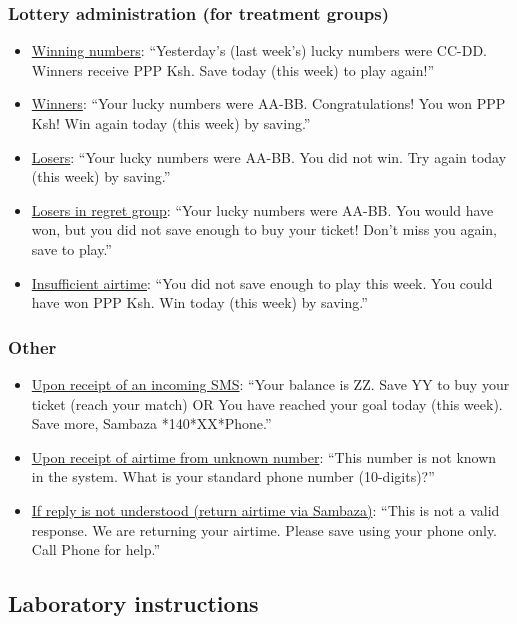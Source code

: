 \documentclass[11pt]{article}
\begin{document}
        \subsubsection{Lottery administration (for treatment groups)}

            \begin{itemize}
                \item \underline{Winning numbers}: ``Yesterday's (last week's) lucky numbers were CC-DD. Winners receive PPP Ksh. Save today (this week) to play again!''
                \item \underline{Winners}: ``Your lucky numbers were AA-BB. Congratulations!  You won PPP Ksh!  Win again today (this week) by saving.''
                \item \underline{Losers}: ``Your lucky numbers were AA-BB. You did not win. Try again today (this week) by saving.''
                \item \underline{Losers in regret group}: ``Your lucky numbers were AA-BB. You would have won, but you did not save enough to buy your ticket!  Don't miss you again, save to play.''
                \item \underline{Insufficient airtime}: ``You did not save enough to play this week. You could have won PPP Ksh. Win today (this week) by saving.''
            \end{itemize}

        \subsubsection{Other}

            \begin{itemize}
                \item \underline{Upon receipt of an incoming SMS}: ``Your balance is ZZ. Save YY to buy your ticket (reach your match) OR You have reached your goal today (this week). Save more, Sambaza *140*XX*Phone.''
                \item \underline{Upon receipt of airtime from unknown number}: ``This number is not known in the system. What is your standard phone number (10-digits)?''
                \item \underline{If reply is not understood (return airtime via Sambaza)}: ``This is not a valid response. We are returning your airtime. Please save using your phone only. Call Phone for help.''
            \end{itemize}

    \subsection{Laboratory instructions}
\end{document}

